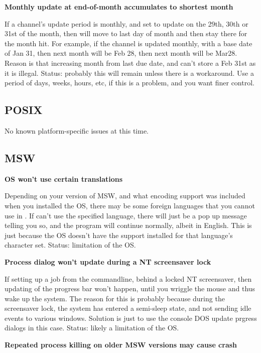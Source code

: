 \begin{helponly}
\bf{Monthly update at end-of-month accumulates to shortest month}

If a channel's update period is monthly, and set to update on the 29th, 30th or 31st
of the month, then will move to last day of month and then stay there for the
month hit. For example, if the channel is updated monthly, with a
base date of Jan 31, then next month will be Feb 28, then next month will be Mar28.
Reason is that increasing month from last due date, and can't store a Feb 31st as it
is illegal. Status: probably this will remain unless there is a workaround. Use
a period of days, weeks, hours, etc, if this is a problem, and you want finer control.

\subsection{POSIX}

No known platform-specific issues at this time.

\subsection{MSW}

\bf{OS won't use certain translations}

Depending on your version of MSW, and what encoding support was included when
you installed the OS, there may be some foreign languages that you cannot use
in \brandingapplicationdesktopname. If \brandingapplicationdesktopname can't use the specified language,
there will just be a pop up message telling you so, and the program will
continue normally, albeit in English.
This is just because the OS doesn't have the support installed for that
language's character set. Status: limitation of the OS.

\bf{Process dialog won't update during a NT screensaver lock}

If setting up a \brandingapplicationdesktopname job from the commandline, behind a locked NT
screensaver, then updating of the progress bar won't happen, until you wriggle
the mouse and thus wake up the system. The reason for this is probably
because during the screensaver lock, the system has entered a semi-sleep
state, and not sending idle events to various windows. Solution is just to 
use the console DOS update prgress dialogs in this case. Status: likely a 
limitation of the OS.

\bf{Repeated process killing on older MSW versions may cause crash}


\end{helponly}
